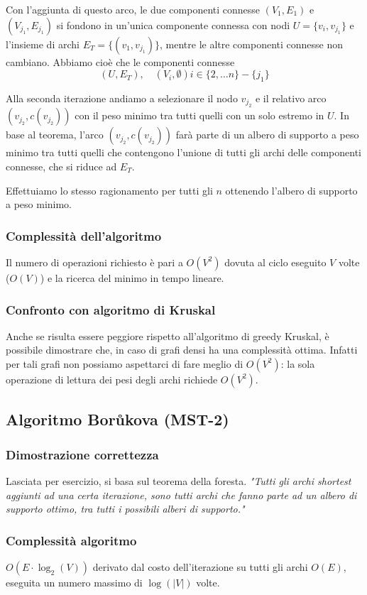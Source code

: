 \documentclass[../template]{subfiles}
\begin{document}
Con l'aggiunta di questo arco, le due componenti connesse $(V_1, E_1)$ e $(V_{j_1}, E_{j_1})$ si fondono in un'unica componente
connessa con nodi $U = \{v_i, v_{j_1}\}$ e l'insieme di archi $E_T = \{(v_1, v_{j_1})\}$, mentre le altre componenti connesse non cambiano.
Abbiamo cioè che le componenti connesse
\[(U, E_T), \quad (V_i, \emptyset) i \in \{2,\ldots n\} - \{j_1\}\]

Alla seconda iterazione andiamo a selezionare il nodo $v_{j_2}$ e il relativo arco $( v_{j_2}, c(v_{j_2}))$ con il peso minimo
tra tutti quelli con un solo estremo in $U$.
In base al teorema, l'arco $(v_{j_2}, c(v_{j_2}))$ farà parte di un albero di supporto a peso minimo tra tutti quelli che contengono
l'unione di tutti gli archi delle componenti connesse, che si riduce ad $E_T$.

Effettuiamo lo stesso ragionamento per tutti gli $n$ ottenendo l'albero di supporto a peso minimo.
\subsubsection{Complessità dell'algoritmo}
Il numero di operazioni richiesto è pari a $O(V^2)$ dovuta al ciclo eseguito $V$ volte ($O(V)$) e la ricerca del minimo in tempo lineare.

\subsubsection{Confronto con algoritmo di Kruskal}
Anche se risulta essere peggiore rispetto all'algoritmo di greedy Kruskal, è possibile dimostrare che, in caso di grafi densi
ha una complessità ottima.
Infatti per tali grafi non possiamo aspettarci di fare meglio di $O(V^2)$: la sola operazione di lettura dei pesi
degli archi richiede $O(V^2)$.

\subsection{Algoritmo Borůkova (MST-2)}

\subsubsection{Dimostrazione correttezza}
Lasciata per esercizio, si basa sul teorema della foresta.
\textit{"Tutti gli archi shortest aggiunti ad una certa iterazione, sono tutti archi
che fanno parte ad un albero di supporto ottimo, tra tutti i possibili
alberi di supporto."}

\subsubsection{Complessità algoritmo}
$O(E \cdot \log_2 (V))$ derivato dal costo dell'iterazione su tutti gli archi
$O(E)$, eseguita un numero massimo di $\log(|V|)$ volte.
\end{document}
